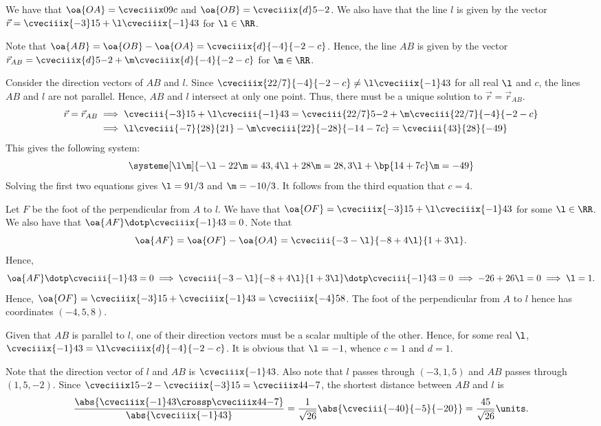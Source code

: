 \begin{solution}
    We have that $\oa{OA} = \cveciiix09c$ and $\oa{OB} = \cveciiix{d}5{-2}$. We also have that the line $l$ is given by the vector $\vec r = \cveciiix{-3}15 + \l \cveciiix{-1}43$ for $\l \in \RR$.

    Note that $\oa{AB} = \oa{OB} - \oa{OA} = \cveciiix{d}{-4}{-2-c}$. Hence, the line $AB$ is given by the vector $\vec r_{AB} = \cveciiix{d}5{-2} + \m \cveciiix{d}{-4}{-2-c}$ for $\m \in \RR$.

    \begin{ppart}
        Consider the direction vectors of $AB$ and $l$. Since $\cveciiix{22/7}{-4}{-2-c} \neq \l\cveciiix{-1}43$ for all real $\l$ and $c$, the lines $AB$ and $l$ are not parallel. Hence, $AB$ and $l$ intersect at only one point. Thus, there must be a unique solution to $\vec r = \vec r_{AB}$.
        \begin{align*}
            \vec r = \vec r_{AB} &\implies \cveciii{-3}15 + \l \cveciii{-1}43 = \cveciii{22/7}5{-2} + \m \cveciii{22/7}{-4}{-2-c}\\
            &\implies \l \cveciii{-7}{28}{21} - \m\cveciii{22}{-28}{-14-7c} = \cveciii{43}{28}{-49}
        \end{align*}
        This gives the following system: \[\systeme[\l\m]{
                {-}\l - 22\m = 43,
                4\l + 28\m = 28,
                3\l + \bp{14 + 7c}\m = -49
            }
        \] Solving the first two equations gives $\l = 91/3$ and $\m = -10/3$. It follows from the third equation that $c = 4$.

        Let $F$ be the foot of the perpendicular from $A$ to $l$. We have that $\oa{OF} = \cveciiix{-3}15 + \l\cveciiix{-1}43$ for some $\l \in \RR$. We also have that $\oa{AF} \dotp \cveciiix{-1}43 = 0$. Note that \[\oa{AF} = \oa{OF} - \oa{OA} = \cveciii{-3-\l}{-8+4\l}{1 + 3\l}.\] Hence, \[\oa{AF} \dotp \cveciii{-1}43 = 0 \implies \cveciii{-3-\l}{-8+4\l}{1 + 3\l} \dotp \cveciii{-1}43 = 0 \implies -26 + 26 \l = 0 \implies \l = 1.\] Hence, $\oa{OF} = \cveciiix{-3}15 + \cveciiix{-1}43 = \cveciiix{-4}58$. The foot of the perpendicular from $A$ to $l$ hence has coordinates $(-4, 5, 8)$.
    \end{ppart}
    \begin{ppart}
        Given that $AB$ is parallel to $l$, one of their direction vectors must be a scalar multiple of the other. Hence, for some real $\l$, $\cveciiix{-1}4{3} = \l\cveciiix{d}{-4}{-2-c}$. It is obvious that $\l = -1$, whence $c = 1$ and $d = 1$.

        Note that the direction vector of $l$ and $AB$ is $\cveciiix{-1}43$. Also note that $l$ passes through $(-3, 1, 5)$ and $AB$ passes through $(1, 5, -2)$. Since $\cveciiix15{-2} - \cveciiix{-3}15 = \cveciiix44{-7}$, the shortest distance between $AB$ and $l$ is \[\frac{\abs{\cveciiix{-1}43 \crossp \cveciiix44{-7}}}{\abs{\cveciiix{-1}43}} = \frac1{\sqrt{26}} \abs{\cveciii{-40}{-5}{-20}} = \frac{45}{\sqrt{26}} \units.\]
    \end{ppart}
\end{solution}

